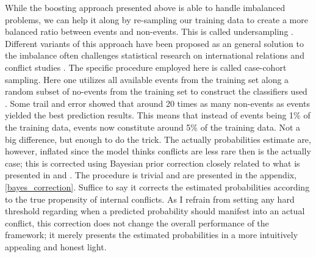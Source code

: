 \documentclass[a4paper]{article}
\begin{document}
While the boosting approach presented above is able to handle imbalanced problems, we can help it along by re-sampling our training data to create a more balanced ratio between events and non-events. This is called undersampling \citep[1266-1267]{He_2008}. Different variants of this approach have been proposed as an general solution to the imbalance often challenges statistical research on international relations and conflict studies \cite{King_Zeng_2001, king_zeng_2001b}. The specific procedure employed here is called case-cohort sampling. Here one utilizes all available events from the training set along a random subset of no-events from the training set to construct the classifiers used \citep[142]{King_Zeng_2001}. Some trail and error showed that around 20 times as many non-events as events yielded the best prediction results. This means that instead of events being 1\% of the training data, events now constitute around 5\% of the training data. Not a big difference, but enough to do the trick. The actually probabilities estimate are, however, inflated since the model thinks conflicts are less rare then is the actually case; this is corrected using Bayesian prior correction closely related to what is presented in \cite{King_Zeng_2001, king_zeng_2001b} and \cite{Goldstone_2010}. The procedure is trivial and are presented in the appendix, \autoref{bayes_correction}. Suffice to say it corrects the estimated probabilities according to the true propensity of internal conflicts. As I refrain from setting any hard threshold regarding when a predicted probability should manifest into an actual conflict, this correction does not change the overall performance of the framework; it merely presents the estimated probabilities in a more intuitively appealing and honest light.\par
\end{document}
